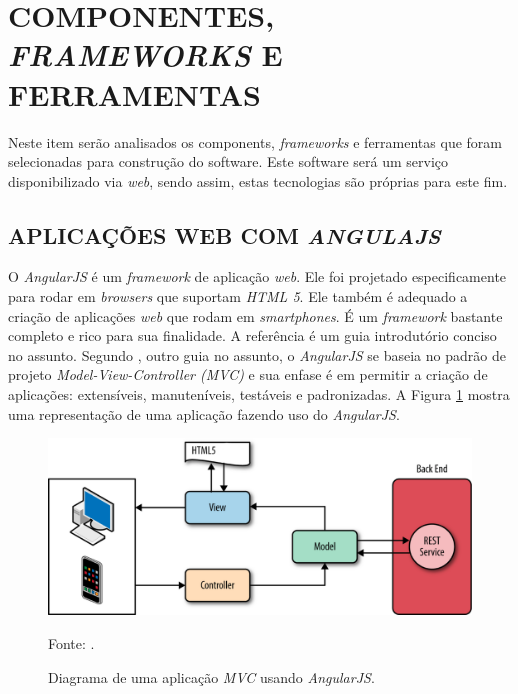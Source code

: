 \section[COMPONENTES, FRAMEWORKS E FERRAMENTAS]{COMPONENTES, \emph{FRAMEWORKS} E FERRAMENTAS}
Neste item serão analisados os components, \emph{frameworks} e ferramentas que foram selecionadas para construção do software. 
Este software será um serviço disponibilizado via \emph{web}, sendo assim, estas tecnologias são próprias para este fim. 

\subsection{APLICAÇÕES WEB COM \emph{ANGULAJS}}
\label{angularjs}
O \emph{AngularJS} é um \emph{framework} de aplicação \emph{web}. 
Ele foi projetado especificamente para rodar em \emph{browsers} que suportam \emph{HTML 5}.
Ele também é adequado a criação de aplicações \emph{web} que rodam em \emph{smartphones}. 
É um \emph{framework} bastante completo e rico para sua finalidade. 
A referência  é um guia introdutório conciso no assunto.
 Segundo , outro guia no assunto, o \emph{AngularJS} se baseia no padrão de projeto \emph{Model-View-Controller (MVC)} e sua enfase é em permitir a criação de aplicações: extensíveis, manuteníveis, testáveis e padronizadas. 
A Figura \ref{angularjs_mvc} mostra uma representação de uma aplicação fazendo uso do \emph{AngularJS}.

\begin{figure}[ht]
	\centering
	\includegraphics[width=14cm]{figuras/angulajs_mvc.eps}
	\caption{Diagrama de uma aplicação \emph{MVC} usando \emph{AngularJS}.}
	\label{angularjs_mvc}
	\footnotesize Fonte:
	\cite{Williamson2015}.
\end{figure}

